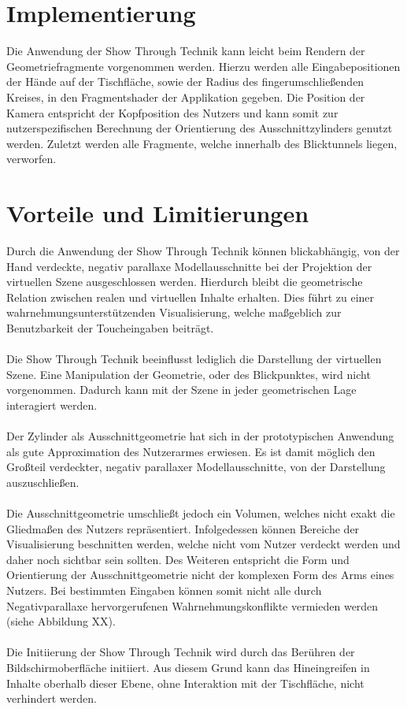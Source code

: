 \section{Implementierung}
\label{sec:implementierung_freischneiden}

Die Anwendung der Show Through Technik kann leicht beim Rendern der Geometriefragmente vorgenommen werden. Hierzu werden alle Eingabepositionen der Hände auf der Tischfläche, sowie der Radius des fingerumschließenden Kreises, in den Fragmentshader der Applikation gegeben. Die Position der Kamera entspricht der Kopfposition des Nutzers und kann somit zur nutzerspezifischen Berechnung der Orientierung des Ausschnittzylinders genutzt werden. Zuletzt werden alle Fragmente, welche innerhalb des Blicktunnels liegen, verworfen.


\section{Vorteile und Limitierungen}
\label{sec:vorteile_und_limitierungen_freischneiden}

Durch die Anwendung der Show Through Technik können blickabhängig, von der Hand verdeckte, negativ parallaxe Modellausschnitte bei der Projektion der virtuellen Szene ausgeschlossen werden. Hierdurch bleibt die geometrische Relation zwischen realen und virtuellen Inhalte erhalten. Dies führt zu einer wahrnehmungsunterstützenden Visualisierung, welche maßgeblich zur Benutzbarkeit der Toucheingaben beiträgt.
\\\\
Die Show Through Technik beeinflusst lediglich die Darstellung der virtuellen Szene. Eine Manipulation der Geometrie, oder des Blickpunktes, wird nicht vorgenommen. Dadurch kann mit der Szene in jeder geometrischen Lage interagiert werden.
\\\\
Der Zylinder als Ausschnittgeometrie hat sich in der prototypischen Anwendung als gute Approximation des Nutzerarmes erwiesen. Es ist damit möglich den Großteil verdeckter, negativ parallaxer Modellausschnitte, von der Darstellung auszuschließen.
\\\\
Die Ausschnittgeometrie umschließt jedoch ein Volumen, welches nicht exakt die Gliedmaßen des Nutzers repräsentiert. Infolgedessen können Bereiche der Visualisierung beschnitten werden, welche nicht vom Nutzer verdeckt werden und daher noch sichtbar sein sollten. Des Weiteren entspricht die Form und Orientierung der Ausschnittgeometrie nicht der komplexen Form des Arms eines Nutzers. Bei bestimmten Eingaben können somit nicht alle durch Negativparallaxe hervorgerufenen Wahrnehmungskonflikte vermieden werden (siehe Abbildung XX).
\\\\
Die Initiierung der Show Through Technik wird durch das Berühren der Bildschirmoberfläche initiiert. Aus diesem Grund kann das Hineingreifen in Inhalte oberhalb dieser Ebene, ohne Interaktion mit der Tischfläche, nicht verhindert werden.